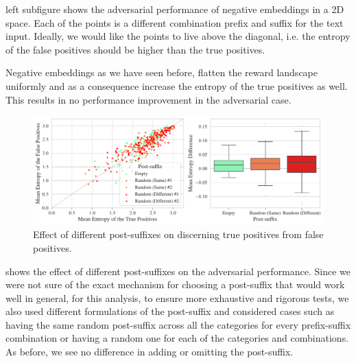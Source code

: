  left subfigure shows the adversarial performance of negative embeddings in a 2D space.
Each of the points is a different combination prefix and suffix for the text input.
Ideally, we would like the points to live above the diagonal, i.e. the entropy of the false positives should be higher than the true positives.

Negative embeddings as we have seen before, flatten the reward landscape uniformly and as a consequence increase the entropy of the true positives as well.
This results in no performance improvement in the adversarial case.

\begin{figure}[H]
    \centering
    \includegraphics[width=\textwidth]{images/post-suffix_adversarial_2.pdf}
    \caption{Effect of different post-suffixes on discerning true positives from false positives.}
    \label{fig:post-suffix-adversarial}
\end{figure}

 shows the effect of different post-suffixes on the adversarial performance.
Since we were not sure of the exact mechanism for choosing a post-suffix that would work well in general, for this analysis, to ensure more exhaustive and rigorous tests, we also used different formulations of the post-suffix and considered cases such as having the same random post-suffix across all the categories for every prefix-suffix combination or having a random one for each of the categories and combinations.
As before, we see no difference in adding or omitting the post-suffix.



